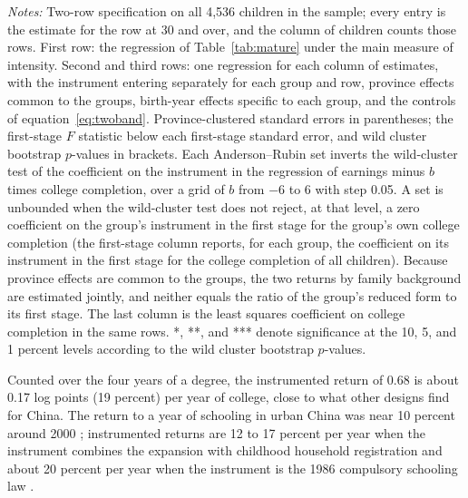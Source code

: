 \documentclass[11pt]{article}
\begin{document}
\begin{table}[t]
\centering
\small
\caption{First stages, earnings reduced forms, and returns to college, for all children and
by family background.}
\label{tab:groups}

\par\smallskip
\begin{minipage}{0.92\textwidth}
\footnotesize\emph{Notes:} Two-row specification on all 4,536 children in the sample; every entry is the estimate for the row at 30 and over,
and the column of children counts those rows. First row: the regression of Table~\ref{tab:mature} under the main measure of intensity. Second and third rows: one regression for each column of estimates, with the instrument entering separately for each group and row, province effects
common to the groups, birth-year effects specific to each
group, and the controls of equation~\eqref{eq:twoband}. Province-clustered standard errors in
parentheses; the first-stage $F$ statistic below each first-stage standard error, and wild cluster bootstrap $p$-values in brackets. Each Anderson--Rubin set inverts the
wild-cluster test of the coefficient on the instrument in the
regression of earnings minus $b$ times college
completion, over a grid of $b$ from $-6$ to 6 with step 0.05. A set is unbounded when the wild-cluster test does not reject, at that level, a zero coefficient on the group's instrument in the first stage for the group's own college completion (the first-stage column reports, for each group, the coefficient on its instrument in the first stage for the college completion of all children). Because province effects are common to the groups, the two returns by family background are
estimated jointly, and neither equals the ratio of the group's reduced form to its first stage. The last column is the least squares coefficient on college completion in the same rows. *, **, and *** denote
significance at the 10, 5, and 1 percent levels according to the wild
cluster bootstrap $p$-values.
\end{minipage}
\end{table}

Counted over the four years of a degree, the instrumented return of
0.68 is about 0.17 log points (19 percent) per year of college, close to what other designs find
for China. The return to a year of schooling in urban China was near 10
percent around 2000 \citep{ZhangZhaoParkSong2005, HeckmanLi2004};
instrumented returns are 12 to 17 percent per year when the instrument combines the expansion with childhood household registration \citep{HuangTaniWeiZhu2022} and
about 20 percent per year when the instrument is the 1986 compulsory
schooling law \citep{FangEtAl2012}.
\end{document}
